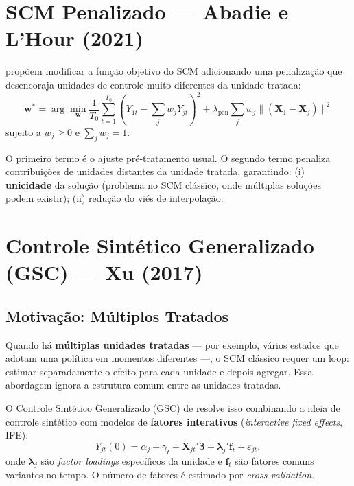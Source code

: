 \documentclass[12pt, a4paper, openany]{book}
\begin{document}
\section{SCM Penalizado --- Abadie e L'Hour (2021)}

\cite{AbadieLHour2021} propõem modificar a função objetivo do SCM adicionando uma penalização que desencoraja unidades de controle muito diferentes da unidade tratada:
\begin{equation}
  \mathbf{w}^* = \arg\min_{\mathbf{w}} \frac{1}{T_0} \sum_{t=1}^{T_0} \left(Y_{1t} - \sum_j w_j Y_{jt}\right)^2 + \lambda_{\text{pen}} \sum_j w_j \|(\mathbf{X}_1 - \mathbf{X}_j)\|^2
  \label{eq:pen_scm}
\end{equation}
sujeito a $w_j \geq 0$ e $\sum_j w_j = 1$.

O primeiro termo é o ajuste pré-tratamento usual. O segundo termo penaliza contribuições de unidades distantes da unidade tratada, garantindo: (i) \textbf{unicidade} da solução (problema no SCM clássico, onde múltiplas soluções podem existir); (ii) redução do viés de interpolação.


\section{Controle Sintético Generalizado (GSC) --- Xu (2017)}

\subsection{Motivação: Múltiplos Tratados}

Quando há \textbf{múltiplas unidades tratadas} --- por exemplo, vários estados que adotam uma política em momentos diferentes ---, o SCM clássico requer um loop: estimar separadamente o efeito para cada unidade e depois agregar. Essa abordagem ignora a estrutura comum entre as unidades tratadas.

O Controle Sintético Generalizado (GSC) de \cite{Xu2017} resolve isso combinando a ideia de controle sintético com modelos de \textbf{fatores interativos} (\textit{interactive fixed effects}, IFE):
\begin{equation}
  Y_{jt}(0) = \alpha_j + \gamma_t + \mathbf{X}_{jt}'\boldsymbol{\beta} + \boldsymbol{\lambda}_j' \mathbf{f}_t + \varepsilon_{jt},
  \label{eq:gsc}
\end{equation}
onde $\boldsymbol{\lambda}_j$ são \textit{factor loadings} específicos da unidade e $\mathbf{f}_t$ são fatores comuns variantes no tempo. O número de fatores é estimado por \textit{cross-validation}.
\end{document}
